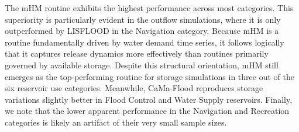 \documentclass[hess, manuscript]{copernicus}
\begin{document}
The mHM routine exhibits the highest performance across most categories. This superiority is particularly evident in the outflow simulations, where it is only outperformed by LISFLOOD in the Navigation category. Because mHM is a routine fundamentally driven by water demand time series, it follows logically that it captures release dynamics more effectively than routines primarily governed by available storage. Despite this structural orientation, mHM still emerges as the top-performing routine for storage simulations in three out of the six reservoir use categories. Meanwhile, CaMa-Flood reproduces storage variations slightly better in Flood Control and Water Supply reservoirs. Finally, we note that the lower apparent performance in the Navigation and Recreation categories is likely an artifact of their very small sample sizes.

\clearpage

\noappendix








\end{document}

